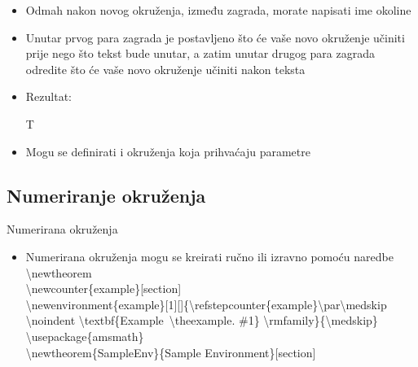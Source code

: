 \documentclass{beamer}
\begin{document}
\begin{frame}
\begin{itemize}
	\item Odmah nakon novog okruženja, između zagrada, morate napisati ime okoline
	\item Unutar prvog para zagrada je postavljeno što će vaše novo okruženje učiniti prije nego što tekst bude unutar, a zatim unutar drugog para zagrada odredite što će vaše novo okruženje učiniti nakon teksta
\item Rezultat:
\begin{boxed}
T
\end{boxed}

	\item Mogu se definirati i okruženja koja prihvaćaju parametre

\end{itemize}
\end{frame}

\subsection{Numeriranje okruženja}

\begin{frame}{Numerirana okruženja}
\begin{itemize}
	\item Numerirana okruženja mogu se kreirati ručno ili izravno pomoću naredbe \textbackslash newtheorem\\

\textbackslash newcounter\{example\}[section]\\
\textbackslash newenvironment\{example\}[1][]\{\textbackslash refstepcounter\{example\}\textbackslash par\textbackslash medskip\\
   \textbackslash noindent \textbackslash textbf\{Example~\textbackslash theexample. \#1\} \textbackslash rmfamily\}\{\textbackslash medskip\}\\
 
 

\textbackslash usepackage\{amsmath\}\\
\textbackslash newtheorem\{SampleEnv\}\{Sample Environment\}[section]\\

\end{itemize}
\end{frame}


\end{document}

